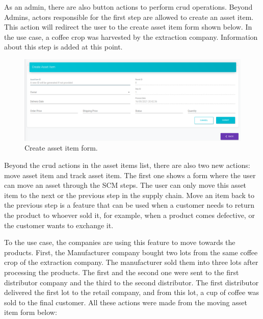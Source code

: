 As an admin, there are also button actions to perform crud operations. Beyond Admins, actors responsible for the first step are allowed to create an asset item. This action will redirect the user to the create asset item form shown below. In the use case, a coffee crop was harvested by the extraction company. Information about this step is added at this point. 

\begin{figure}[H]
\begin{center}
  \includegraphics[scale=0.3]{images/use_example/09_create_asset_Item.png}
\caption{Create asset item form.}
\label{fig:create_asset_item}
\end{center}
\end{figure}


Beyond the crud actions in the asset items list, there are also two new actions: move asset item and track asset item. The first one shows a form where the user can move an asset through the SCM steps. The user can only move this asset item to the next or the previous step in the supply chain. Move an item back to the previous step is a feature that can be used when a customer needs to return the product to whoever sold it, for example, when a product comes defective, or the customer wants to exchange it. 

To the use case, the companies are using this feature to move towards the products. First, the Manufacturer company bought two lots from the same coffee crop of the extraction company. The manufacturer sold them into three lots after processing the products. The first and the second one were sent to the first distributor company and the third to the second distributor. The first distributor delivered the first lot to the retail company, and from this lot, a cup of coffee was sold to the final customer. All these actions were made from the moving asset item form below:

